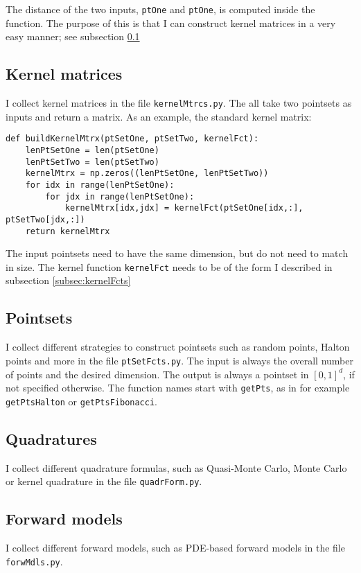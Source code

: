 \documentclass[11pt]{article}
\begin{document}
The distance of the two inputs, \texttt{ptOne} and \texttt{ptOne}, is computed inside the function. The purpose of this is that I can construct kernel matrices in a very easy manner; see subsection \ref{subsec:kernelMtrcs}

\subsection{Kernel matrices}
\label{subsec:kernelMtrcs}
I collect kernel matrices in the file \texttt{kernelMtrcs.py}. The all take two pointsets as inputs and return a matrix. As an example, the standard kernel matrix: 
\begin{Verbatim}[formatcom=\color{blue!50!black}]
def buildKernelMtrx(ptSetOne, ptSetTwo, kernelFct):
    lenPtSetOne = len(ptSetOne)
    lenPtSetTwo = len(ptSetTwo)
    kernelMtrx = np.zeros((lenPtSetOne, lenPtSetTwo))
    for idx in range(lenPtSetOne):
        for jdx in range(lenPtSetOne):
            kernelMtrx[idx,jdx] = kernelFct(ptSetOne[idx,:], ptSetTwo[jdx,:])
    return kernelMtrx
\end{Verbatim}

The input pointsets need to have the same dimension, but do not need to match in size. The kernel function \texttt{kernelFct} needs to be of the form I described in subsection \ref{subsec:kernelFcts}


\subsection{Pointsets}
I collect different strategies to construct pointsets such as random points, Halton points and more in the file \texttt{ptSetFcts.py}. The input is always the overall number of points and the desired dimension. The output is always a pointset in $[0,1]^d$, if not specified otherwise. The function names start with \texttt{getPts}, as in for example \texttt{getPtsHalton} or \texttt{getPtsFibonacci}.


\subsection{Quadratures}
I collect different quadrature formulas, such as Quasi-Monte Carlo, Monte Carlo or kernel quadrature in the file \texttt{quadrForm.py}.


\subsection{Forward models}
I collect different forward models, such as PDE-based forward models in the file \texttt{forwMdls.py}.
\end{document}
